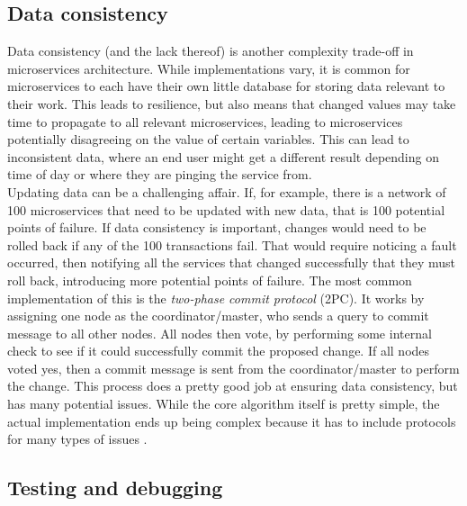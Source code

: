 \subsection{Data consistency}
Data consistency (and the lack thereof) is another complexity trade-off in microservices architecture.
While implementations vary, it is common for microservices to each have their own little database for storing data relevant to their work.
This leads to resilience, but also means that changed values may take time to propagate to all relevant microservices, leading to microservices potentially disagreeing on the value of certain variables.
This can lead to inconsistent data, where an end user might get a different result depending on time of day or where they are pinging the service from.\\
Updating data can be a challenging affair. If, for example, there is a network of 100 microservices that need to be updated with new data, that is 100 potential points of failure.
If data consistency is important, changes would need to be rolled back if any of the 100 transactions fail. 
That would require noticing a fault occurred, then notifying all the services that changed successfully that they must roll back, introducing more potential points of failure.
The most common implementation of this is the \textit{two-phase commit protocol} (2PC). 
It works by assigning one node as the coordinator/master, who sends a query to commit message to all other nodes.
All nodes then vote, by performing some internal check to see if it could successfully commit the proposed change.
If all nodes voted yes, then a commit message is sent from the coordinator/master to perform the change.
This process does a pretty good job at ensuring data consistency, but has many potential issues.
While the core algorithm itself is pretty simple, the actual implementation ends up being complex because it has to include protocols for many types of issues \cite*{Samaras2009}.    

\subsection{Testing and debugging}
